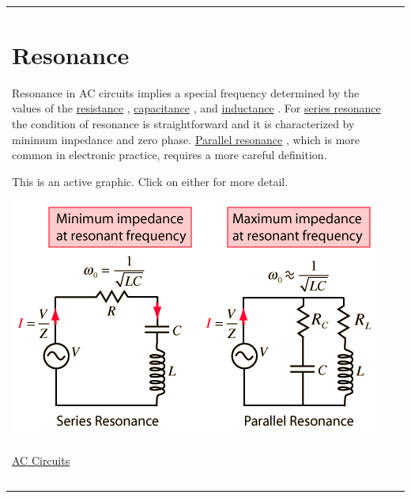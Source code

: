 \protect\hypertarget{c1}{}{}

\begin{longtable}[]{@{}ll@{}}
\toprule
\begin{minipage}[t]{0.48\columnwidth}\raggedright\strut
\section{Resonance}\label{resonance}

Resonance in AC circuits implies a special frequency determined by the
values of the
\href{http://hyperphysics.phy-astr.gsu.edu/hbase/electric/acres.html\#c1}{resistance}
,
\href{http://hyperphysics.phy-astr.gsu.edu/hbase/electric/accap.html\#c1}{capacitance}
, and
\href{http://hyperphysics.phy-astr.gsu.edu/hbase/electric/acind.html\#c1}{inductance}
. For
\href{http://hyperphysics.phy-astr.gsu.edu/hbase/electric/serres.html\#c2}{series
resonance} the condition of resonance is straightforward and it is
characterized by minimum impedance and zero phase.
\href{http://hyperphysics.phy-astr.gsu.edu/hbase/electric/parres.html\#c1}{Parallel
resonance} , which is more common in electronic practice, requires a
more careful definition.

This is an active graphic. Click on either for more detail.

\includegraphics{./resonant-rlc-circuits_files/acres.png}\strut
\end{minipage} & \begin{minipage}[t]{0.48\columnwidth}\raggedright\strut
\href{http://hyperphysics.phy-astr.gsu.edu/hbase/hframe.html}{Index}\\[2\baselineskip]\href{http://hyperphysics.phy-astr.gsu.edu/hbase/electric/accircon.html\#c1}{AC
Circuits}\strut
\end{minipage}\tabularnewline
\begin{minipage}[t]{0.48\columnwidth}\raggedright\strut
~


\end{minipage}
\end{longtable}
